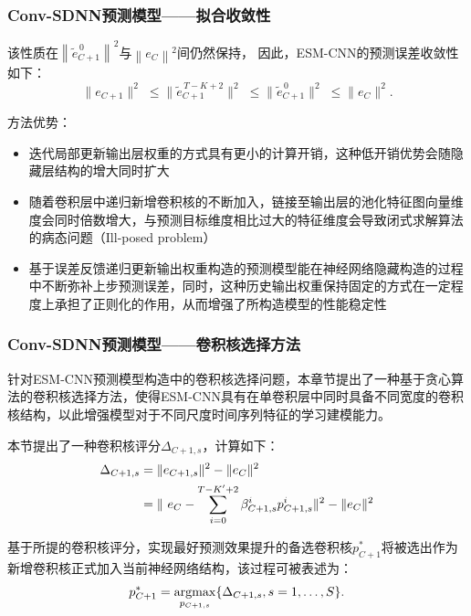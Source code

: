 \begin{frame}
    \frametitle{Conv-SDNN预测模型——拟合收敛性}

    该性质在$\left\|\tilde{e}_{C+1}^{\, 0}\right\|^{2}$与$\left\|e_{C}\right\|^{2}$间仍然保持，
    因此，ESM-CNN的预测误差收敛性如下：
    $$
        \|e_{C+1}\|^2  \; \leq \|\tilde{e}_{C+1}^{\, T-K+2}\|^2 \; \leq \|\tilde{e}_{C+1}^{\,0}\|^2 \; \leq \|{e}_{C}\|^2 .
    $$

    方法优势：
    \begin{itemize}
        \item 迭代局部更新输出层权重的方式具有更小的计算开销，这种低开销优势会随隐藏层结构的增大同时扩大
        \item 随着卷积层中递归新增卷积核的不断加入，链接至输出层的池化特征图向量维度会同时倍数增大，与预测目标维度相比过大的特征维度会导致闭式求解算法的病态问题（Ill-posed problem）
        \item 基于误差反馈递归更新输出权重构造的预测模型能在神经网络隐藏构造的过程中不断弥补上步预测误差，同时，这种历史输出权重保持固定的方式在一定程度上承担了正则化的作用，从而增强了所构造模型的性能稳定性
    \end{itemize}
\end{frame}

\begin{frame}
    \frametitle{Conv-SDNN预测模型——卷积核选择方法}

    针对ESM-CNN预测模型构造中的卷积核选择问题，本章节提出了一种基于贪心算法的卷积核选择方法，使得ESM-CNN具有在单卷积层中同时具备不同宽度的卷积核结构，以此增强模型对于不同尺度时间序列特征的学习建模能力。

    本节提出了一种卷积核评分$\Delta_{{C+1, s}}$，计算如下：
    \begin{align*}
        \Delta_{{C+1},s} & = \| e_{C+1,s} \|^2 - \| e_{C} \|^2 \notag                                                                        \\
        {}               & = \|\ e_C -\sum_{i=0}^{T-K^{\prime}+2} \beta_{C+1, s}^i p_{C+1, s}^i \|^2 -  \| e_{C} \|^2 \label{eq:filterScore}
    \end{align*}


    基于所提的卷积核评分，实现最好预测效果提升的备选卷积核$p_{C+1}^{*}$将被选出作为新增卷积核正式加入当前神经网络结构，该过程可被表述为：
    \begin{equation*}\label{eq:scselection}
        p_{C+1}^{*} = \operatorname*{argmax}\limits_{p_{{C+1},s}} \{ \Delta_{{C+1},s}, s = 1,\ldots,S \}.
    \end{equation*}

\end{frame}

